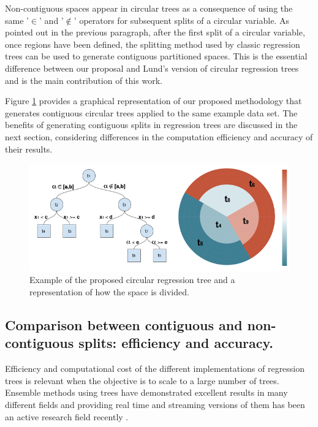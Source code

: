 \documentclass[times,twocolumn,final,authoryear]{elsarticle}
\begin{document}
Non-contiguous spaces appear in circular trees as a consequence of using the same '$\in$' and '$\notin$' operators for subsequent splits of a circular variable. As pointed out in the previous paragraph, after the first split of a circular variable, once regions have been defined, the splitting method used by classic regression trees can be used to generate contiguous partitioned spaces. This is the essential difference between our proposal and Lund's version of circular regression trees and is the main contribution of this work.

Figure \ref{f4} provides a graphical representation of our proposed methodology that generates contiguous circular trees applied to the same example data set. The benefits of generating contiguous splits in regression trees are discussed in the next section, considering differences in the computation efficiency and accuracy of their results.

%
\begin{figure}
  \includegraphics[width=17cm]{fig4_master.png}
\caption{Example of the proposed circular regression tree and a representation of how the space is divided.}
\label{f4}       %
\end{figure}
%


\subsection{Comparison between contiguous and non-contiguous splits: efficiency and accuracy.} 

Efficiency and computational cost of the different implementations of regression trees is relevant when the objective is to scale to a large number of trees. Ensemble methods using trees have demonstrated excellent results in many different fields and providing real time and streaming versions of them has been an active research field recently \citep{Abdulsalametal2007}. 
\end{document}
